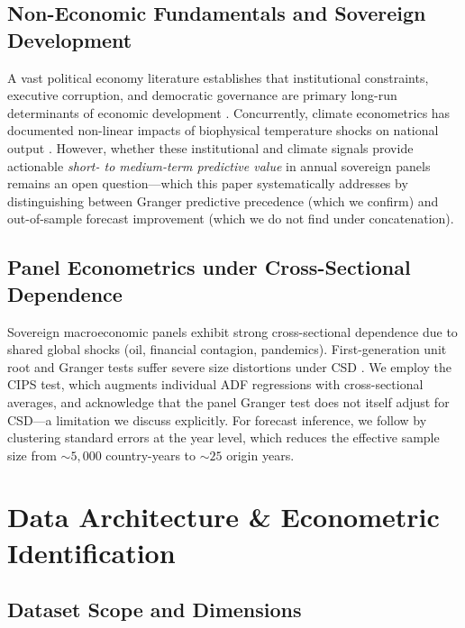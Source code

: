 \documentclass[11pt,a4paper]{article}
\begin{document}
\subsection{Non-Economic Fundamentals and Sovereign Development}

A vast political economy literature establishes that institutional constraints, executive corruption, and democratic governance are primary long-run determinants of economic development \citep{acemoglu2001, acemoglu2005, knack1997, algan2010}. Concurrently, climate econometrics has documented non-linear impacts of biophysical temperature shocks on national output \citep{burke2015, dell2014, hsiang2016}. However, whether these institutional and climate signals provide actionable \emph{short- to medium-term predictive value} in annual sovereign panels remains an open question---which this paper systematically addresses by distinguishing between Granger predictive precedence (which we confirm) and out-of-sample forecast improvement (which we do not find under concatenation).

\subsection{Panel Econometrics under Cross-Sectional Dependence}

Sovereign macroeconomic panels exhibit strong cross-sectional dependence due to shared global shocks (oil, financial contagion, pandemics). First-generation unit root and Granger tests suffer severe size distortions under CSD \citep{pesaran2006, pesaran2021cd}. We employ the \citet{pesaran2007} CIPS test, which augments individual ADF regressions with cross-sectional averages, and acknowledge that the \citet{dumitrescu2012} panel Granger test does not itself adjust for CSD---a limitation we discuss explicitly. For forecast inference, we follow \citet{driscollkraay1998} by clustering standard errors at the year level, which reduces the effective sample size from ${\sim}5{,}000$ country-years to ${\sim}25$ origin years.


\section{Data Architecture \& Econometric Identification}
\label{sec:data}

\subsection{Dataset Scope and Dimensions}
\end{document}
